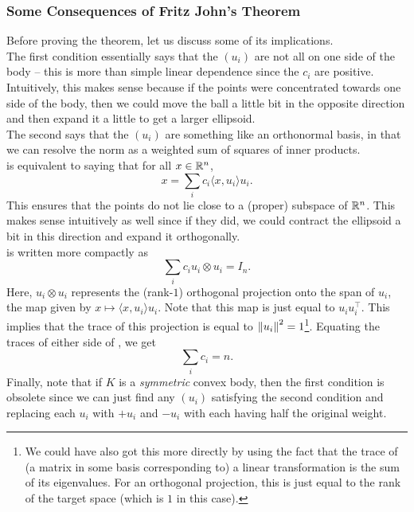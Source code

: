 \subsubsection{Some Consequences of Fritz John's Theorem}

Before proving the theorem, let us discuss some of its implications.\\

The first condition essentially says that the $(u_i)$ are not all on one side of the body -- this is more than simple linear dependence since the $c_i$ are positive. Intuitively, this makes sense because if the points were concentrated towards one side of the body, then we could move the ball a little bit in the opposite direction and then expand it a little to get a larger ellipsoid.\\
The second says that the $(u_i)$ are something like an orthonormal basis, in that we can resolve the norm as a weighted sum of squares of inner products.\\
 is equivalent to saying that for all $x\in\mathbb{R}^n$,
\[ x = \sum_i c_i \langle x,u_i\rangle u_i. \]
This ensures that the points do not lie close to a (proper) subspace of $\mathbb{R}^n$. This makes sense intuitively as well since if they did, we could contract the ellipsoid a bit in this direction and expand it orthogonally.\\

 is written more compactly as
\begin{equation}
\label{eqn orthogonal projection compact notation}
    \sum_i c_i u_i \otimes u_i = I_n.
\end{equation}
Here, $u_i\otimes u_i$ represents the (rank-$1$) orthogonal projection onto the span of $u_i$, the map given by $x\mapsto \langle x,u_i\rangle u_i$. Note that this map is just equal to $u_i u_i^\top$. This implies that the trace of this projection is equal to $\left\lVert u_i\right\rVert^2 = 1$\footnote{We could have also got this more directly by using the fact that the trace of (a matrix in some basis corresponding to) a linear transformation is the sum of its eigenvalues. For an orthogonal projection, this is just equal to the rank of the target space (which is $1$ in this case).}. Equating the traces of either side of , we get
\begin{equation}
\label{eqn sum of fritz john constants is n}
    \sum_i c_i = n.
\end{equation}
Finally, note that if $K$ is a \textit{symmetric} convex body, then the first condition is obsolete since we can just find any $(u_i)$ satisfying the second condition and replacing each $u_i$ with $+u_i$ and $-u_i$ with each having half the original weight.\\

